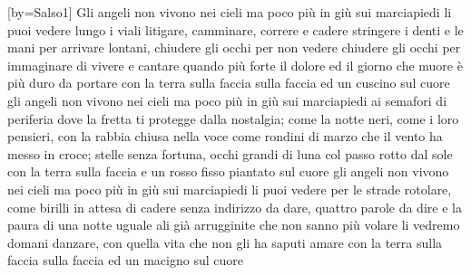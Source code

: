 [by={Salso1}]
\beginverse
Gli angeli non vivono nei cieli
ma poco più in giù sui marciapiedi
li puoi vedere lungo i viali litigare,
camminare, correre e cadere
stringere i denti e le mani
per arrivare lontani,
chiudere gli occhi per non vedere
chiudere gli occhi per immaginare
di vivere e cantare quando più forte
il dolore ed il giorno che muore è più duro da portare con la terra sulla faccia
sulla faccia ed un cuscino sul cuore
gli angeli non vivono nei cieli
ma poco più in giù sui marciapiedi
ai semafori di periferia dove la fretta
ti protegge dalla nostalgia;
come la notte neri, come i loro pensieri, con la rabbia chiusa nella voce
come rondini di marzo
che il vento ha messo in croce;
stelle senza fortuna, occhi grandi di luna col passo rotto dal sole
con la terra sulla faccia
e un rosso fisso piantato sul cuore
gli angeli non vivono nei cieli
ma poco più in giù  sui marciapiedi
li puoi vedere per le strade rotolare,
come birilli in attesa di cadere
senza indirizzo da dare,
quattro parole da dire
e la paura di una notte uguale
ali già arrugginite che non sanno più volare li vedremo domani danzare, con quella vita che non gli ha saputi amare
con la terra sulla faccia sulla faccia
ed un macigno sul cuore
\endverse
\endsong
